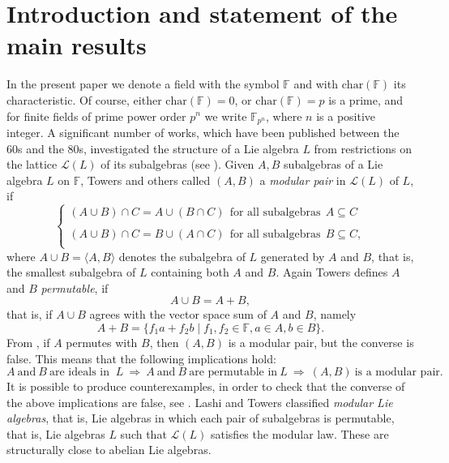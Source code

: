 \documentclass{amsart}
\theoremstyle{definition}
\numberwithin{equation}{section}
\begin{document}
\maketitle


\section{Introduction and statement of the main results}
In the present paper we denote a  field with the symbol $\mathbb{F}$ and with $\mathrm{char}(\mathbb{F})$ its characteristic. Of course, either    $\mathrm{char}(\mathbb{F})=0$, or $\mathrm{char}(\mathbb{F})=p$ is a prime, and  for finite fields of prime power order $p^n$ we write  $\mathbb{F}_{p^n}$, where $n$ is a positive integer.  A significant number of works, which have been published between the 60s and the 80s, investigated   the structure of a Lie algebra $L$ from restrictions on the lattice $\mathcal{L}(L)$ of its subalgebras (see \cite{amayo1976, amsc,  elduque1, gein, kolman1965, lashi, david1981}). Given  $A, B$  subalgebras of a Lie algebra $L$ on $\mathbb{F}$, Towers and others \cite{elduque1, elduque2, david1981, david1987} called  $(A, B)$ a \textit{modular pair}  in  $\mathcal{L}(L)$ of $L$,  if
\[ \begin{cases}
(A\cup B)\cap C =A\cup (B\cap C) \ \ \mbox{for all subalgebras} \ \ A\subseteq C\\
\\
(A\cup B)\cap C =B\cup (A\cap C) \ \ \mbox{for all subalgebras} \ \ B\subseteq C,\\
\end{cases} \] 
 where  $A\cup B=\langle A,B \rangle $ denotes the subalgebra of $L$ generated by $A$ and $B$, that is, the smallest subalgebra of $L$ containing both $A$ and $B$. Again Towers \cite{david1981} defines  $A$ and $B$ \textit{permutable}, if $$A\cup B= A+B,$$ that is, if $A\cup B$ agrees with the vector space sum of $A$ and $B$, namely $$A+B=\{f_1a+f_2b \mid f_1, f_2 \in \mathbb{F}, a \in A, b\in B\}.$$  From \cite[Lemma 1.1]{david1981},  if  $A$ permutes with $B$, then $(A, B)$ is a modular pair, but  the converse is false. This means that the following implications hold:
   \[A \ \mbox{and} \ B \  \mbox{are ideals in } \ L  \ \Longrightarrow \ A \ 
 \mbox{and} \ B \ \mbox{are permutable in} \ L \ \Longrightarrow \ (A,B) \ \mbox{is a modular pair}.\]
It is possible to produce counterexamples, in order to check that the converse of the above  implications are false, see \cite{elduque1, lashi, david1981}. Lashi and Towers \cite{lashi, david1981} classified \textit{modular Lie algebras}, that is, Lie algebras in which each pair of subalgebras is permutable, that is, Lie algebras $L$ such that  $\mathcal{L}(L)$ satisfies the modular law. These are structurally close to abelian Lie algebras.
\end{document}
